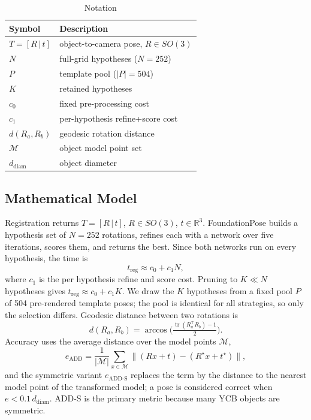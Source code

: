\documentclass[10pt,twocolumn,letterpaper]{article}
\begin{document}
\begin{table}[tb]
\caption{Notation}
\label{tab:notation}
\centering\small
\begin{tabular}{@{}ll@{}}
\toprule
Symbol & Description \\
\midrule
$T=[R\,|\,t]$ & object-to-camera pose, $R\in SO(3)$ \\
$N$ & full-grid hypotheses ($N = 252$) \\
$P$ & template pool ($|P| = 504$) \\
$K$ & retained hypotheses \\
$c_0$ & fixed pre-processing cost \\
$c_1$ & per-hypothesis refine+score cost \\
$d(R_a, R_b)$ & geodesic rotation distance \\
$\mathcal{M}$ & object model point set \\
$d_{\mathrm{diam}}$ & object diameter \\
\bottomrule
\end{tabular}
\end{table}

\subsection{Mathematical Model}
Registration returns $T = [R\,|\,t]$, $R \in SO(3)$, $t \in \mathbb{R}^3$. FoundationPose builds a hypothesis set of $N = 252$ rotations, refines each with a network over five iterations, scores them, and returns the best. Since both networks run on every hypothesis, the time is
\begin{equation}
t_{\mathrm{reg}} \approx c_0 + c_1 N,
\end{equation}
where $c_1$ is the per hypothesis refine and score cost. Pruning to $K \ll N$ hypotheses gives $t_{\mathrm{reg}} \approx c_0 + c_1 K$. We draw the $K$ hypotheses from a fixed pool $P$ of 504 pre-rendered template poses; the pool is identical for all strategies, so only the selection differs. Geodesic distance between two rotations is
\begin{equation}
d(R_a,R_b)=\arccos\!\Big(\tfrac{\operatorname{tr}(R_a^{\top}R_b)-1}{2}\Big).
\end{equation}
Accuracy uses the average distance over the model points $\mathcal{M}$,
\begin{equation}
e_{\mathrm{ADD}}=\frac{1}{|\mathcal{M}|}\sum_{x\in\mathcal{M}}\big\lVert(Rx+t)-(R^\star x+t^\star)\big\rVert,
\end{equation}
and the symmetric variant $e_{\mathrm{ADD\text{-}S}}$ replaces the term by the distance to the nearest model point of the transformed model; a pose is considered correct when $e < 0.1\,d_{\mathrm{diam}}$. ADD-S is the primary metric because many YCB objects are symmetric.
\end{document}
